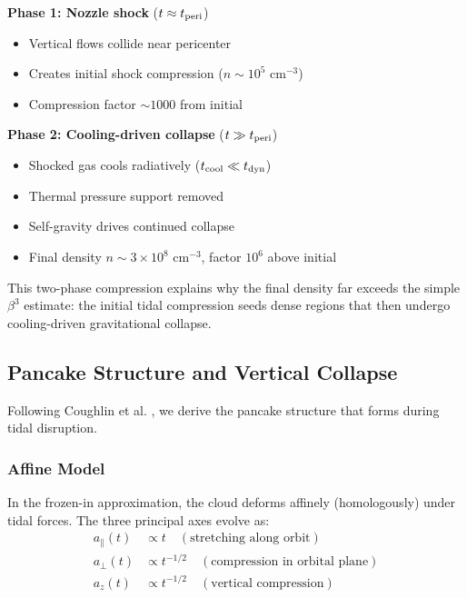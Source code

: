 \documentclass[twocolumn,amsmath,amssymb,prd,superscriptaddress,nofootinbib]{revtex4-2}
\begin{document}
\textbf{Phase 1: Nozzle shock} ($t \approx t_{\rm peri}$)
\begin{itemize}
    \item Vertical flows collide near pericenter
    \item Creates initial shock compression ($n \sim 10^5$ cm$^{-3}$)
    \item Compression factor $\sim 1000$ from initial
\end{itemize}

\textbf{Phase 2: Cooling-driven collapse} ($t \gg t_{\rm peri}$)
\begin{itemize}
    \item Shocked gas cools radiatively ($t_{\rm cool} \ll t_{\rm dyn}$)
    \item Thermal pressure support removed
    \item Self-gravity drives continued collapse
    \item Final density $n \sim 3 \times 10^8$ cm$^{-3}$, factor $10^6$ above initial
\end{itemize}

This two-phase compression explains why the final density far exceeds the simple $\beta^3$ estimate: the initial tidal compression seeds dense regions that then undergo cooling-driven gravitational collapse.

\subsection{Pancake Structure and Vertical Collapse}
\label{sec:pancake}

Following Coughlin et al. \cite{Coughlin2019}, we derive the pancake structure that forms during tidal disruption.

\subsubsection{Affine Model}

In the frozen-in approximation, the cloud deforms affinely (homologously) under tidal forces. The three principal axes evolve as:
\begin{align}
    a_\parallel(t) &\propto t \quad (\text{stretching along orbit}) \\
    a_\perp(t) &\propto t^{-1/2} \quad (\text{compression in orbital plane}) \\
    a_z(t) &\propto t^{-1/2} \quad (\text{vertical compression})
\end{align}
\end{document}
